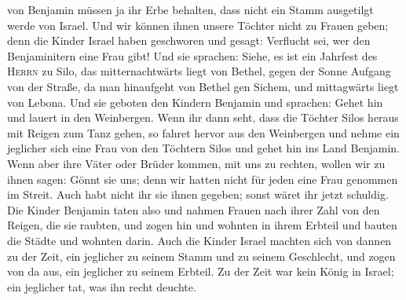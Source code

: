 von Benjamin müssen ja ihr Erbe behalten, dass nicht ein Stamm
ausgetilgt werde von Israel.  Und wir können ihnen unsere
Töchter nicht zu Frauen geben; denn die Kinder Israel haben geschworen
und gesagt: Verflucht sei, wer den Benjaminitern eine Frau gibt!
 Und sie sprachen: Siehe, es ist ein Jahrfest des
\textsc{Herrn} zu Silo, das mitternachtwärts liegt von Bethel, gegen der
Sonne Aufgang von der Straße, da man hinaufgeht von Bethel gen Sichem,
und mittagwärts liegt von Lebona.  Und sie geboten den
Kindern Benjamin und sprachen: Gehet hin und lauert in den Weinbergen.
 Wenn ihr dann seht, dass die Töchter Silos heraus mit
Reigen zum Tanz gehen, so fahret hervor aus den Weinbergen und nehme ein
jeglicher sich eine Frau von den Töchtern Silos und gehet hin ins Land
Benjamin.  Wenn aber ihre Väter oder Brüder kommen, mit
uns zu rechten, wollen wir zu ihnen sagen: Gönnt sie uns; denn wir
hatten nicht für jeden eine Frau genommen im Streit. Auch habt nicht ihr
sie ihnen gegeben; sonst wäret ihr jetzt schuldig.  Die
Kinder Benjamin taten also und nahmen Frauen nach ihrer Zahl von den
Reigen, die sie raubten, und zogen hin und wohnten in ihrem Erbteil und
bauten die Städte und wohnten darin.  Auch die Kinder
Israel machten sich von dannen zu der Zeit, ein jeglicher zu seinem
Stamm und zu seinem Geschlecht, und zogen von da aus, ein jeglicher zu
seinem Erbteil.  Zu der Zeit war kein König in Israel;
ein jeglicher tat, was ihn recht deuchte.
